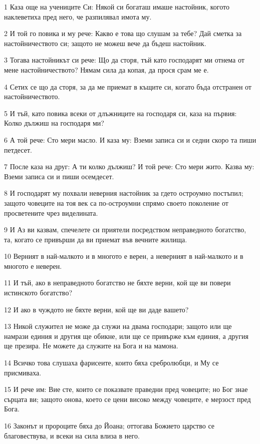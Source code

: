 \par 1 Каза още на учениците Си: Някой си богаташ имаше настойник, когото наклеветиха пред него, че разпилявал имота му.
\par 2 И той го повика и му рече: Какво е това що слушам за тебе? Дай сметка за настойничеството си; защото не можеш вече да бъдеш настойник.
\par 3 Тогава настойникът си рече: Що да сторя, тъй като господарят ми отнема от мене настойничеството? Нямам сила да копая, да прося срам ме е.
\par 4 Сетих се що да сторя, за да ме приемат в къщите си, когато бъда отстранен от настойничеството.
\par 5 И тъй, като повика всеки от длъжниците на господаря си, каза на първия: Колко дължиш на господаря ми?
\par 6 А той рече: Сто мери масло. И каза му: Вземи записа си и седни скоро та пиши петдесет.
\par 7 После каза на друг: А ти колко дължиш? И той рече: Сто мери жито. Казва му: Вземи записа си и пиши осемдесет.
\par 8 И господарят му похвали неверния настойник за гдето остроумно постъпил; защото човеците на тоя век са по-остроумни спрямо своето поколение от просветените чрез виделината.
\par 9 И Аз ви казвам, спечелете си приятели посредством неправедното богатство, та, когато се привърши да ви приемат във вечните жилища.
\par 10 Верният в най-малкото и в многото е верен, а неверният в най-малкото и в многото е неверен.
\par 11 И тъй, ако в неправедното богатство не бяхте верни, кой ще ви повери истинското богатство?
\par 12 И ако в чуждото не бяхте верни, кой ще ви даде вашето?
\par 13 Никой служител не може да служи на двама господари; защото или ще намрази единия и другия ще обикне, или ще се привърже към единия, а другия ще презира. Не можете да служите на Бога и на мамона.
\par 14 Всичко това слушаха фарисеите, които бяха сребролюбци, и Му се присмиваха.
\par 15 И рече им: Вие сте, които се показвате праведни пред човеците; но Бог знае сърцата ви; защото онова, което се цени високо между човеците, е мерзост пред Бога.
\par 16 Законът и пророците бяха до Йоана; оттогава Божието царство се благовествува, и всеки на сила влиза в него.
